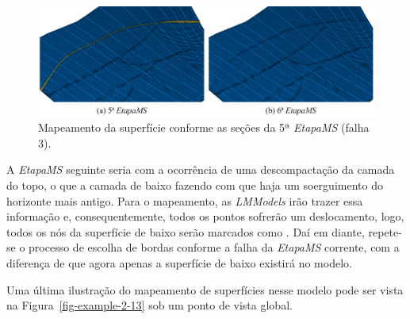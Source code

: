 \begin{figure} [H]
  \begin{center}
    \includegraphics[width=\textwidth]{images/fig-example-2-12}
    \caption{Mapeamento da superfície conforme as seções da 5ª \textit{EtapaMS} (falha 3).}\label{fig-example-2-12}
  \end{center}
\end{figure}

A \textit{EtapaMS} seguinte seria com a ocorrência de uma descompactação da camada do topo, o que  a camada de baixo fazendo com que haja um soerguimento do horizonte mais antigo. Para o mapeamento, as \textit{LMModels} irão trazer essa informação e, consequentemente, todos os pontos sofrerão um deslocamento, logo, todos os nós da superfície de baixo serão marcados como . Daí em diante, repete-se o processo de escolha de bordas conforme a falha da \textit{EtapaMS} corrente, com a diferença de que agora apenas a superfície de baixo existirá no modelo.

Uma última ilustração do mapeamento de superfícies nesse modelo pode ser vista na Figura~\ref{fig-example-2-13} sob um ponto de vista global.

